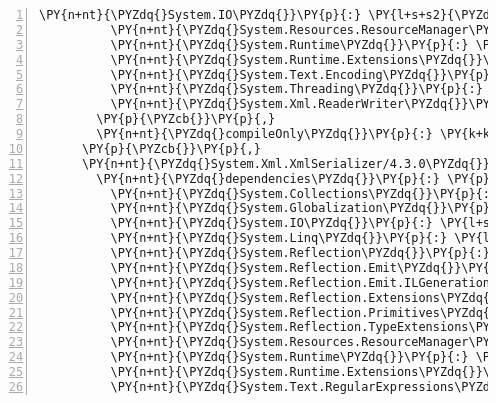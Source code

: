 \begin{Verbatim}[commandchars=\\\{\},numbers=left,firstnumber=1,stepnumber=1,numberblanklines=0]
          \PY{n+nt}{\PYZdq{}System.IO\PYZdq{}}\PY{p}{:} \PY{l+s+s2}{\PYZdq{}4.3.0\PYZdq{}}\PY{p}{,}
          \PY{n+nt}{\PYZdq{}System.Resources.ResourceManager\PYZdq{}}\PY{p}{:} \PY{l+s+s2}{\PYZdq{}4.3.0\PYZdq{}}\PY{p}{,}
          \PY{n+nt}{\PYZdq{}System.Runtime\PYZdq{}}\PY{p}{:} \PY{l+s+s2}{\PYZdq{}4.3.0\PYZdq{}}\PY{p}{,}
          \PY{n+nt}{\PYZdq{}System.Runtime.Extensions\PYZdq{}}\PY{p}{:} \PY{l+s+s2}{\PYZdq{}4.3.0\PYZdq{}}\PY{p}{,}
          \PY{n+nt}{\PYZdq{}System.Text.Encoding\PYZdq{}}\PY{p}{:} \PY{l+s+s2}{\PYZdq{}4.3.0\PYZdq{}}\PY{p}{,}
          \PY{n+nt}{\PYZdq{}System.Threading\PYZdq{}}\PY{p}{:} \PY{l+s+s2}{\PYZdq{}4.3.0\PYZdq{}}\PY{p}{,}
          \PY{n+nt}{\PYZdq{}System.Xml.ReaderWriter\PYZdq{}}\PY{p}{:} \PY{l+s+s2}{\PYZdq{}4.3.0\PYZdq{}}
        \PY{p}{\PYZcb{}}\PY{p}{,}
        \PY{n+nt}{\PYZdq{}compileOnly\PYZdq{}}\PY{p}{:} \PY{k+kc}{true}
      \PY{p}{\PYZcb{}}\PY{p}{,}
      \PY{n+nt}{\PYZdq{}System.Xml.XmlSerializer/4.3.0\PYZdq{}}\PY{p}{:} \PY{p}{\PYZob{}}
        \PY{n+nt}{\PYZdq{}dependencies\PYZdq{}}\PY{p}{:} \PY{p}{\PYZob{}}
          \PY{n+nt}{\PYZdq{}System.Collections\PYZdq{}}\PY{p}{:} \PY{l+s+s2}{\PYZdq{}4.3.0\PYZdq{}}\PY{p}{,}
          \PY{n+nt}{\PYZdq{}System.Globalization\PYZdq{}}\PY{p}{:} \PY{l+s+s2}{\PYZdq{}4.3.0\PYZdq{}}\PY{p}{,}
          \PY{n+nt}{\PYZdq{}System.IO\PYZdq{}}\PY{p}{:} \PY{l+s+s2}{\PYZdq{}4.3.0\PYZdq{}}\PY{p}{,}
          \PY{n+nt}{\PYZdq{}System.Linq\PYZdq{}}\PY{p}{:} \PY{l+s+s2}{\PYZdq{}4.3.0\PYZdq{}}\PY{p}{,}
          \PY{n+nt}{\PYZdq{}System.Reflection\PYZdq{}}\PY{p}{:} \PY{l+s+s2}{\PYZdq{}4.3.0\PYZdq{}}\PY{p}{,}
          \PY{n+nt}{\PYZdq{}System.Reflection.Emit\PYZdq{}}\PY{p}{:} \PY{l+s+s2}{\PYZdq{}4.3.0\PYZdq{}}\PY{p}{,}
          \PY{n+nt}{\PYZdq{}System.Reflection.Emit.ILGeneration\PYZdq{}}\PY{p}{:} \PY{l+s+s2}{\PYZdq{}4.3.0\PYZdq{}}\PY{p}{,}
          \PY{n+nt}{\PYZdq{}System.Reflection.Extensions\PYZdq{}}\PY{p}{:} \PY{l+s+s2}{\PYZdq{}4.3.0\PYZdq{}}\PY{p}{,}
          \PY{n+nt}{\PYZdq{}System.Reflection.Primitives\PYZdq{}}\PY{p}{:} \PY{l+s+s2}{\PYZdq{}4.3.0\PYZdq{}}\PY{p}{,}
          \PY{n+nt}{\PYZdq{}System.Reflection.TypeExtensions\PYZdq{}}\PY{p}{:} \PY{l+s+s2}{\PYZdq{}4.3.0\PYZdq{}}\PY{p}{,}
          \PY{n+nt}{\PYZdq{}System.Resources.ResourceManager\PYZdq{}}\PY{p}{:} \PY{l+s+s2}{\PYZdq{}4.3.0\PYZdq{}}\PY{p}{,}
          \PY{n+nt}{\PYZdq{}System.Runtime\PYZdq{}}\PY{p}{:} \PY{l+s+s2}{\PYZdq{}4.3.0\PYZdq{}}\PY{p}{,}
          \PY{n+nt}{\PYZdq{}System.Runtime.Extensions\PYZdq{}}\PY{p}{:} \PY{l+s+s2}{\PYZdq{}4.3.0\PYZdq{}}\PY{p}{,}
          \PY{n+nt}{\PYZdq{}System.Text.RegularExpressions\PYZdq{}}\PY{p}{:} \PY{l+s+s2}{\PYZdq{}4.3.0\PYZdq{}}\PY{p}{,}

\end{Verbatim}
